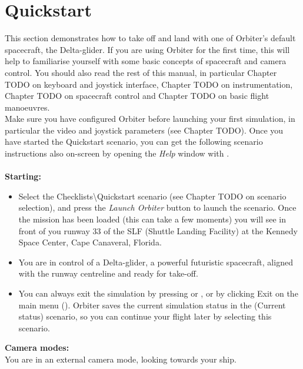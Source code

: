 \documentclass[Orbiter User Manual.tex]{subfiles}
\begin{document}
\section{Quickstart}
This section demonstrates how to take off and land with one of Orbiter's default spacecraft, the Delta-glider. If you are using Orbiter for the first time, this will help to familiarise yourself with some basic concepts of spacecraft and camera control. You should also read the rest of this manual, in particular Chapter TODO on keyboard and joystick interface, Chapter TODO on instrumentation, Chapter TODO on spacecraft control and Chapter TODO on basic flight manoeuvres.\\
Make sure you have configured Orbiter before launching your first simulation, in particular the video and joystick parameters (see Chapter TODO). Once you have started the Quickstart scenario, you can get the following scenario instructions also on-screen by opening the \textit{Help} window with \Alt{}.\\
\\
\textbf{Starting:}

\begin{itemize}
\item Select the Checklists\textbackslash Quickstart scenario (see Chapter TODO on scenario selection), and press the \textit{Launch Orbiter} button to launch the scenario. Once the mission has been loaded (this can take a few moments) you will see in front of you runway 33 of the SLF (Shuttle Landing Facility) at the Kennedy Space Center, Cape Canaveral, Florida.
\item You are in control of a Delta-glider, a powerful futuristic spacecraft, aligned with the runway centreline and ready for take-off.
\item You can always exit the simulation by pressing \Ctrl{} or \Alt{}, or by clicking Exit on the main menu (). Orbiter saves the current simulation status in the (Current status) scenario, so you can continue your flight later by selecting this scenario.
\end{itemize}

\noindent
\textbf{Camera modes:}\\
You are in an external camera mode, looking towards your ship.
\end{document}
